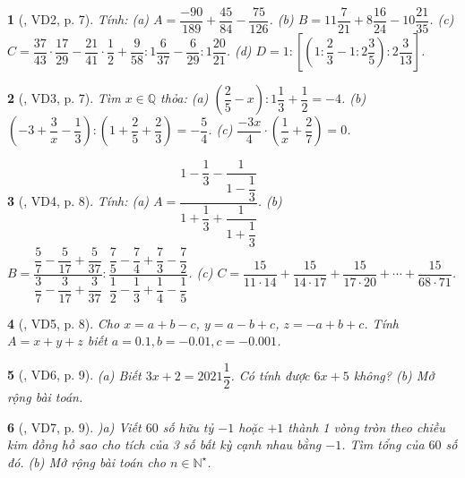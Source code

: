 \documentclass{article}
\newtheorem{baitoan}{}
\begin{document}
\begin{baitoan}[\cite{Binh_boi_duong_Toan_7_tap_1}, VD2, p. 7]
	Tính: (a) $A = \dfrac{-90}{189} + \dfrac{45}{84} - \dfrac{75}{126}$. (b) $B = 11\dfrac{7}{21} + 8\dfrac{16}{24} - 10\dfrac{21}{35}$. (c) $C = \dfrac{37}{43}\cdot\dfrac{17}{29} - \dfrac{21}{41}\cdot\dfrac{1}{2} + \dfrac{9}{58}:1\dfrac{6}{37} - \dfrac{6}{29}:1\dfrac{20}{21}$. (d) $D = 1:\left[\left(1:\dfrac{2}{3} - 1:2\dfrac{3}{5}\right):2\dfrac{3}{13}\right]$.
\end{baitoan}

\begin{baitoan}[\cite{Binh_boi_duong_Toan_7_tap_1}, VD3, p. 7]
	Tìm $x\in\mathbb{Q}$ thỏa: (a) $\left(\dfrac{2}{5} - x\right):1\dfrac{1}{3} + \dfrac{1}{2} = -4$. (b) $\left(-3 + \dfrac{3}{x} - \dfrac{1}{3}\right):\left(1 + \dfrac{2}{5} + \dfrac{2}{3}\right) = -\dfrac{5}{4}$. (c) $\dfrac{-3x}{4}\cdot\left(\dfrac{1}{x} + \dfrac{2}{7}\right) = 0$.
\end{baitoan}

\begin{baitoan}[\cite{Binh_boi_duong_Toan_7_tap_1}, VD4, p. 8]
	Tính: (a) $A = \dfrac{1 - \dfrac{1}{3} - \dfrac{1}{1 - \dfrac{1}{3}}}{1 + \dfrac{1}{3} + \dfrac{1}{1 + \dfrac{1}{3}}}$. (b) $B = \dfrac{\dfrac{5}{7} - \dfrac{5}{17} + \dfrac{5}{37}}{\dfrac{3}{7} - \dfrac{3}{17} + \dfrac{3}{37}}:\dfrac{\dfrac{7}{5} - \dfrac{7}{4} + \dfrac{7}{3} - \dfrac{7}{2}}{\dfrac{1}{2} - \dfrac{1}{3} + \dfrac{1}{4} - \dfrac{1}{5}}$. (c) $C = \dfrac{15}{11\cdot14} + \dfrac{15}{14\cdot17} + \dfrac{15}{17\cdot20} + \cdots + \dfrac{15}{68\cdot71}$.
\end{baitoan}

\begin{baitoan}[\cite{Binh_boi_duong_Toan_7_tap_1}, VD5, p. 8]
	Cho $x = a + b - c$, $y = a - b + c$, $z = -a + b + c$. Tính $A = x + y + z$ biết $a = 0.1,b = -0.01,c = -0.001$.
\end{baitoan}

\begin{baitoan}[\cite{Binh_boi_duong_Toan_7_tap_1}, VD6, p. 9]
	(a) Biết $3x + 2 = 2021\dfrac{1}{2}$. Có tính được $6x + 5$ không? (b) Mở rộng bài toán.
\end{baitoan}

\begin{baitoan}[\cite{Binh_boi_duong_Toan_7_tap_1}, VD7, p. 9]
	)a) Viết $60$ số hữu tỷ $-1$ hoặc $+1$ thành 1 vòng tròn theo chiều kim đồng hồ sao cho tích của 3 số bất kỳ cạnh nhau bằng $-1$. Tìm tổng của $60$ số đó. (b) Mở rộng bài toán cho $n\in\mathbb{N}^\star$.
\end{baitoan}
\end{document}
